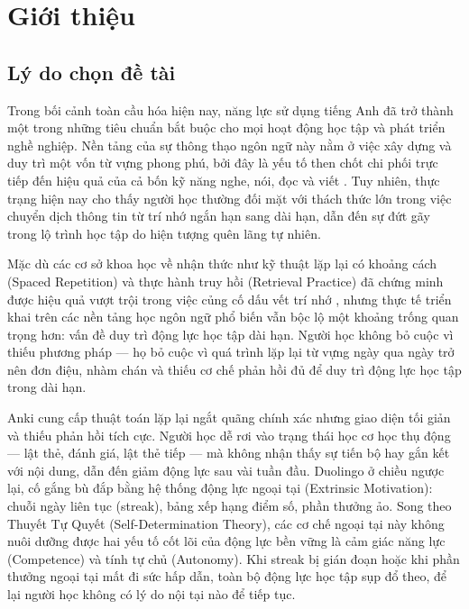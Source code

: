 \chapter{Giới thiệu}
\label{Chapter1}

\section{Lý do chọn đề tài}

Trong bối cảnh toàn cầu hóa hiện nay, năng lực sử dụng tiếng Anh đã trở thành một trong những tiêu chuẩn bắt buộc cho mọi hoạt động học tập và phát triển nghề nghiệp. Nền tảng của sự thông thạo ngôn ngữ này nằm ở việc xây dựng và duy trì một vốn từ vựng phong phú, bởi đây là yếu tố then chốt chi phối trực tiếp đến hiệu quả của cả bốn kỹ năng nghe, nói, đọc và viết \cite{Nation2001}. Tuy nhiên, thực trạng hiện nay cho thấy người học thường đối mặt với thách thức lớn trong việc chuyển dịch thông tin từ trí nhớ ngắn hạn sang dài hạn, dẫn đến sự đứt gãy trong lộ trình học tập do hiện tượng quên lãng tự nhiên.

Mặc dù các cơ sở khoa học về nhận thức như kỹ thuật lặp lại có khoảng cách (Spaced Repetition) và thực hành truy hồi (Retrieval Practice) đã chứng minh được hiệu quả vượt trội trong việc củng cố dấu vết trí nhớ \cite{Cepeda2008, Karpicke2008}, nhưng thực tế triển khai trên các nền tảng học ngôn ngữ phổ biến vẫn bộc lộ một khoảng trống quan trọng hơn: vấn đề duy trì động lực học tập dài hạn. Người học không bỏ cuộc vì thiếu phương pháp — họ bỏ cuộc vì quá trình lặp lại từ vựng ngày qua ngày trở nên đơn điệu, nhàm chán và thiếu cơ chế phản hồi đủ để duy trì động lực học tập trong dài hạn.

Anki cung cấp thuật toán lặp lại ngắt quãng chính xác nhưng giao diện tối giản và thiếu phản hồi tích cực. Người học dễ rơi vào trạng thái học cơ học thụ động — lật thẻ, đánh giá, lật thẻ tiếp — mà không nhận thấy sự tiến bộ hay gắn kết với nội dung, dẫn đến giảm động lực sau vài tuần đầu. Duolingo ở chiều ngược lại, cố gắng bù đắp bằng hệ thống động lực ngoại tại (Extrinsic Motivation): chuỗi ngày liên tục (streak), bảng xếp hạng điểm số, phần thưởng ảo. Song theo Thuyết Tự Quyết (Self-Determination Theory), các cơ chế ngoại tại này không nuôi dưỡng được hai yếu tố cốt lõi của động lực bền vững là cảm giác năng lực (Competence) và tính tự chủ (Autonomy). Khi streak bị gián đoạn hoặc khi phần thưởng ngoại tại mất đi sức hấp dẫn, toàn bộ động lực học tập sụp đổ theo, để lại người học không có lý do nội tại nào để tiếp tục.


